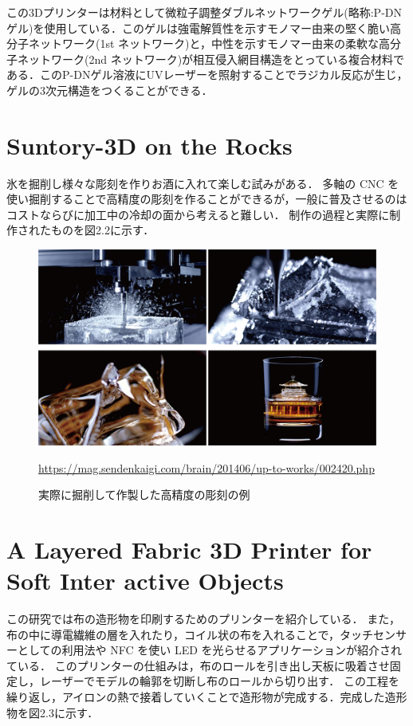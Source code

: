 この3Dプリンターは材料として微粒子調整ダブルネットワークゲル(略称:P-DNゲル)を使用している．このゲルは強電解質性を示すモノマー由来の堅く脆い高分子ネットワーク(1st ネットワーク)と，中性を示すモノマー由来の柔軟な高分子ネットワーク(2nd ネットワーク)が相互侵入網目構造をとっている複合材料である．このP-DNゲル溶液にUVレーザーを照射することでラジカル反応が生じ，ゲルの3次元構造をつくることができる．


\section{Suntory-3D on the Rocks\cite{b}}
\label{sec:enum}

氷を掘削し様々な彫刻を作りお酒に入れて楽しむ試みがある．
多軸の CNC を使い掘削することで高精度の彫刻を作ることができるが，一般に普及させるのはコストならびに加工中の冷却の面から考えると難しい．
制作の過程と実際に制作されたものを図2.2に示す．

\begin{figure}[H]
  \centering
  \includegraphics[width=12truecm]{./fig/Suntory.jpg}
  \caption{実際に掘削して作製した高精度の彫刻の例}
  \url{https://mag.sendenkaigi.com/brain/201406/up-to-works/002420.php} %
  \label{fig:Suntory}
\end{figure}


\section{A Layered Fabric 3D Printer for Soft Inter active Objects\cite{c}}
\label{sec:enum}
この研究では布の造形物を印刷するためのプリンターを紹介している．
また，布の中に導電繊維の層を入れたり，コイル状の布を入れることで，タッチセンサーとしての利用法や NFC を使い LED を光らせるアプリケーションが紹介されている．
このプリンターの仕組みは，布のロールを引き出し天板に吸着させ固定し，レーザーでモデルの輪郭を切断し布のロールから切り出す．
この工程を繰り返し，アイロンの熱で接着していくことで造形物が完成する．完成した造形物を図2.3に示す．


